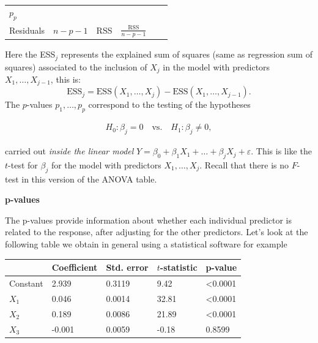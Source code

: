 \documentclass[]{book}
\theoremstyle{definition}
\theoremstyle{definition}
\theoremstyle{definition}
\theoremstyle{remark}
\begin{document}
\begin{longtable}[]{@{}llllll@{}}
\begin{minipage}[t]{0.15\columnwidth}
\(p_p\)\strut
\end{minipage}\tabularnewline
\begin{minipage}[t]{0.16\columnwidth}\raggedright\strut
Residuals\strut
\end{minipage} & \begin{minipage}[t]{0.14\columnwidth}\raggedright\strut
\(n - p - 1\)\strut
\end{minipage} & \begin{minipage}[t]{0.10\columnwidth}\raggedright\strut
RSS\strut
\end{minipage} & \begin{minipage}[t]{0.11\columnwidth}\raggedright\strut
\(\frac{\text{RSS}}{n-p-1}\)\strut
\end{minipage} & \begin{minipage}[t]{0.18\columnwidth}\raggedright\strut
\strut
\end{minipage} & \begin{minipage}[t]{0.15\columnwidth}\raggedright\strut
\strut
\end{minipage}\tabularnewline
\bottomrule
\end{longtable}

Here the ESS\(_j\) represents the explained sum of squares (same as
regression sum of squares) associated to the inclusion of \(X_j\) in the
model with predictors \(X_1,\ldots,X_{j-1}\), this is: \[
\text{ESS}_j=\text{ESS}(X_1,\ldots,X_j)-\text{ESS}(X_1,\ldots,X_{j-1}).
\] The \(p\)-values \(p_1,\ldots,p_p\) correspond to the testing of the
hypotheses

\begin{align*}
H_0:\beta_j=0\quad\text{vs.}\quad H_1:\beta_j\neq 0,
\end{align*}

carried out \emph{inside the linear model}
\(Y=\beta_0+\beta_1X_1+\ldots+\beta_jX_j+\varepsilon\). This is like the
\(t\)-test for \(\beta_j\) for the model with predictors
\(X_1,\ldots,X_j\). Recall that there is no \(F\)-test in this version
of the ANOVA table.

\textbf{p-values}

The p-values provide information about whether each individual predictor
is related to the response, after adjusting for the other predictors.
Let's look at the following table we obtain in general using a
statistical software for example

\begin{longtable}[]{@{}lllll@{}}
\toprule
& Coefficient & Std. error & \(t\)-statistic & p-value\tabularnewline
\midrule
\endhead
Constant & 2.939 & 0.3119 & 9.42 & \textless{}0.0001\tabularnewline
\(X_1\) & 0.046 & 0.0014 & 32.81 & \textless{}0.0001\tabularnewline
\(X_2\) & 0.189 & 0.0086 & 21.89 & \textless{}0.0001\tabularnewline
\(X_3\) & -0.001 & 0.0059 & -0.18 & 0.8599\tabularnewline
\bottomrule
\end{longtable}
\end{document}
